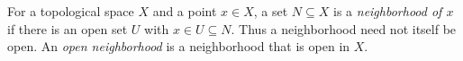 
For a topological space $X$ and a point $x\in X$, a set $N\subseteq X$ is a \emph{neighborhood of $x$} if there is an open set $U$ with $x\in U\subseteq N$. Thus a neighborhood need not itself be open. An \emph{open neighborhood} is a neighborhood that is open in $X$.
